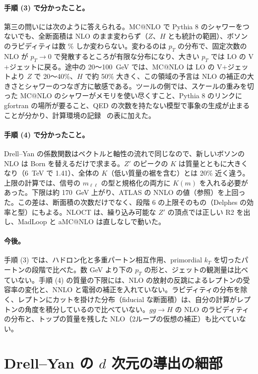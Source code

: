 \documentclass[a4paper,10pt]{ltjsarticle}
\begin{document}
\paragraph{手順 (3) で分かったこと。}第三の問いには次のように答えられる。MC@NLO で Pythia 8 のシャワーをつないでも、全断面積は NLO のまま変わらず（$Z$、$H$ とも統計の範囲）、ボソンのラピディティは数 \% しか変わらない。変わるのは $p_T$ の分布で、固定次数の NLO が $p_T\to0$ で発散するところが有限な分布になり、大きい $p_T$ では LO の V$+$ジェットに戻る。途中の 20〜100~GeV では、MC@NLO は LO の V$+$ジェットより $Z$ で 20〜40\%、$H$ で約 50\% 大きく、この領域の予言は NLO の補正の大きさとシャワーのつなぎ方に敏感である。ツールの側では、スケールの重みを切った MC@NLO のシャワーがメモリを使い尽くすこと、Pythia 8 のリンクに gfortran の場所が要ること、QED の次数を持たない模型で事象の生成が止まることが分かり、計算環境の記録~\cite{env} の表に加えた。

\paragraph{手順 (4) で分かったこと。}Drell--Yan の係数関数はベクトルと軸性の流れで同じなので、新しいボソンの NLO は Born を替えるだけで求まる。$Z'$ のピークの $K$ は質量とともに大きくなり（6~TeV で 1.41）、全体の $K$（低い質量の裾を含む）とは 20\% 近く違う。上限の計算では、信号の $m_{\ell\ell}$ の型と規格化の両方に $K(m)$ を入れる必要があった。下限は約 170~GeV 上がり、ATLAS の NNLO の値（参照）を上回った。この差は、断面積の次数だけでなく、段階 6 の上限そのもの（Delphes の効率と型）にもよる。NLOCT は、繰り込み可能な $Z'$ の頂点では正しい R2 を出し、MadLoop と aMC@NLO は直しなしで動いた。

\paragraph{今後。}手順 (3) では、ハドロン化と多重パートン相互作用、primordial $k_T$ を切ったパートンの段階で比べた。数 GeV より下の $p_T$ の形と、ジェットの観測量は比べていない。手順 (4) の質量の下限には、NLO の放射の反跳によるレプトンの受容率の変化と、NNLO と電弱の補正を入れていない。ラピディティの分布を除く、レプトンにカットを掛けた分布（fiducial な断面積）は、自分の計算がレプトンの角度を積分しているので比べていない。$gg\to H$ の NLO のラピディティの分布と、トップの質量を残した NLO（2ループの仮想の補正）も比べていない。

\appendix
\section{Drell--Yan の $d$ 次元の導出の細部}\label{app:dy}
\end{document}
